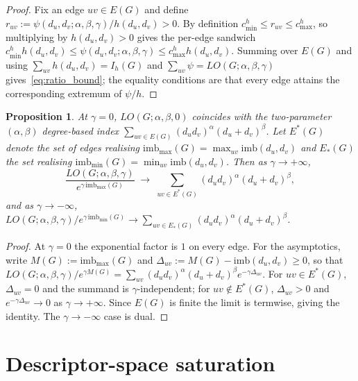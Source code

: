 \documentclass[a5paper, 10pt]{article}
\theoremstyle{plain}
\newtheorem{proposition}[theorem]{Proposition}
\theoremstyle{remark}
\theoremstyle{definition}
\newcommand{\Wuzi}{LO(G;\alpha,\beta,\gamma)}
\begin{document}
  \begin{proof}
  Fix an edge $uv \in E(G)$ and define
  $r_{uv} := \psi(d_u, d_v; \alpha, \beta, \gamma)/h(d_u, d_v) > 0$.
  By definition $c_{\min}^{h} \le r_{uv} \le c_{\max}^{h}$, so
  multiplying by $h(d_u, d_v) > 0$ gives the per-edge sandwich
  $c_{\min}^{h} h(d_u, d_v) \le \psi(d_u, d_v; \alpha, \beta, \gamma)
  \le c_{\max}^{h} h(d_u, d_v)$. Summing over $E(G)$ and using
  $\sum_{uv} h(d_u, d_v) = I_h(G)$ and $\sum_{uv} \psi = \Wuzi$
  gives~\eqref{eq:ratio_bound}; the equality conditions are that
  every edge attains the corresponding extremum of $\psi/h$.
  \end{proof}

  \begin{proposition}\label{prop:gamma_eq_0_or_inf}
  At $\gamma = 0$, $LO(G; \alpha, \beta, 0)$ coincides with the
  two-parameter $(\alpha, \beta)$ degree-based index
  $\sum_{uv \in E(G)} (d_u d_v)^{\alpha}(d_u + d_v)^{\beta}$.
  Let $E^{*}(G)$ denote the set of edges realising
  $\mathrm{imb}_{\max}(G) = \max_{uv} \mathrm{imb}(d_u, d_v)$
  and $E_{*}(G)$ the set realising
  $\mathrm{imb}_{\min}(G) = \min_{uv} \mathrm{imb}(d_u, d_v)$.
  Then as $\gamma \to +\infty$,
  \[
  \frac{\Wuzi}{e^{\gamma\, \mathrm{imb}_{\max}(G)}}
  \;\longrightarrow\;
  \sum_{uv \in E^{*}(G)} (d_u d_v)^{\alpha}(d_u + d_v)^{\beta},
  \]
  and as $\gamma \to -\infty$,
  $\Wuzi / e^{\gamma\, \mathrm{imb}_{\min}(G)} \longrightarrow
  \sum_{uv \in E_{*}(G)} (d_u d_v)^{\alpha}(d_u + d_v)^{\beta}$.
  \end{proposition}

  \begin{proof}
  At $\gamma = 0$ the exponential factor is $1$ on every edge.
  For the asymptotics, write $M(G) := \mathrm{imb}_{\max}(G)$ and
  $\Delta_{uv} := M(G) - \mathrm{imb}(d_u, d_v) \ge 0$, so that
  $\Wuzi / e^{\gamma M(G)} = \sum_{uv} (d_u d_v)^{\alpha}(d_u +
  d_v)^{\beta} e^{-\gamma \Delta_{uv}}$. For $uv \in E^{*}(G)$,
  $\Delta_{uv} = 0$ and the summand is $\gamma$-independent; for
  $uv \notin E^{*}(G)$, $\Delta_{uv} > 0$ and $e^{-\gamma \Delta_{uv}}
  \to 0$ as $\gamma \to +\infty$. Since $E(G)$ is finite the limit
  is termwise, giving the identity. The $\gamma \to -\infty$ case is
  dual.
  \end{proof}

\section{Descriptor-space saturation}\label{sec:saturation}
\end{document}
